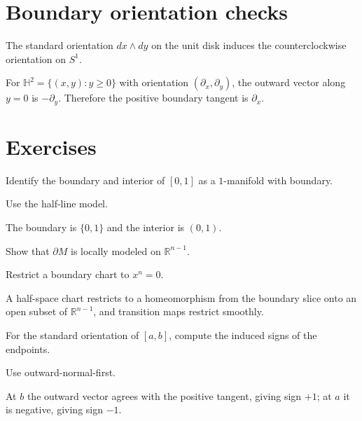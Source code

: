 \section{Boundary orientation checks}
\begin{example}\label{ex:vii11-disk}
The standard orientation $dx\wedge dy$ on the unit disk induces the counterclockwise orientation on $S^1$.
\end{example}

\begin{example}\label{ex:vii11-halfplane}
For $\mathbb H^2=\{(x,y):y\ge0\}$ with orientation $(\partial_x,\partial_y)$, the outward vector along $y=0$ is $-\partial_y$. Therefore the positive boundary tangent is $\partial_x$.
\end{example}


\section{Exercises}

\begin{exercise}\label{exr:vii11-01}
Identify the boundary and interior of $[0,1]$ as a $1$-manifold with boundary.
\end{exercise}
\begin{hint}
Use the half-line model.
\end{hint}
\begin{solution}
The boundary is $\{0,1\}$ and the interior is $(0,1)$.
\end{solution}

\begin{exercise}\label{exr:vii11-02}
Show that $\partial M$ is locally modeled on $\mathbb R^{n-1}$.
\end{exercise}
\begin{hint}
Restrict a boundary chart to $x^n=0$.
\end{hint}
\begin{solution}
A half-space chart restricts to a homeomorphism from the boundary slice onto an open subset of $\mathbb R^{n-1}$, and transition maps restrict smoothly.
\end{solution}

\begin{exercise}\label{exr:vii11-03}
For the standard orientation of $[a,b]$, compute the induced signs of the endpoints.
\end{exercise}
\begin{hint}
Use outward-normal-first.
\end{hint}
\begin{solution}
At $b$ the outward vector agrees with the positive tangent, giving sign $+1$; at $a$ it is negative, giving sign $-1$.
\end{solution}

